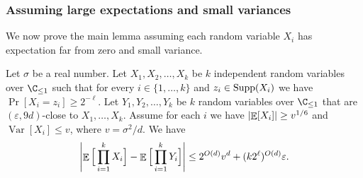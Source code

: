 \documentclass{toc}
\def\eps{\varepsilon}
\def\Blocklength{\ell}
\def\Supp{\textnormal{Supp}}
\DeclarePairedDelimiter{\abs}{\lvert}{\rvert}
\DeclareMathOperator*{\E}{\mathbb{E}}                 %
\DeclareMathOperator*{\Var}{Var}                 %
\begin{document}
  \subsubsection{Assuming large expectations and small variances}
  We now prove the main lemma assuming each random variable $X_i$ has expectation far from zero and small variance.
  \begin{lemma} \label{lemma-GKM2}
    Let $\sigma$ be a real number.
    Let $X_1, X_2, \ldots, X_k$ be $k$ independent random variables over $\C_{\le 1}$ such that for every $i \in \{1, \ldots, k\}$ and $z_i \in \Supp(X_i)$ we have $\Pr[X_i = z_i] \ge 2^{-\Blocklength}$.
    Let $Y_1, Y_2, \ldots, Y_k$ be $k$ random variables over $\C_{\le 1}$ that are $(\eps, 9d)$-close to $X_1, \ldots, X_k$.
    Assume for each $i$ we have $\abs{\E[X_i]} \ge v^{1/6}$ and $\Var[X_i] \le v$, where $v = \sigma^2/d$.
    We have
    \[
      \abs*{ \E \Big[ \prod_{i = 1}^k X_i \Big] - \E \Big[ \prod_{i = 1}^k Y_i \Big] }
      \le 2^{O(d)} v^d + (k 2^\Blocklength)^{O(d)} \eps .
    \]
  \end{lemma}
\end{document}
